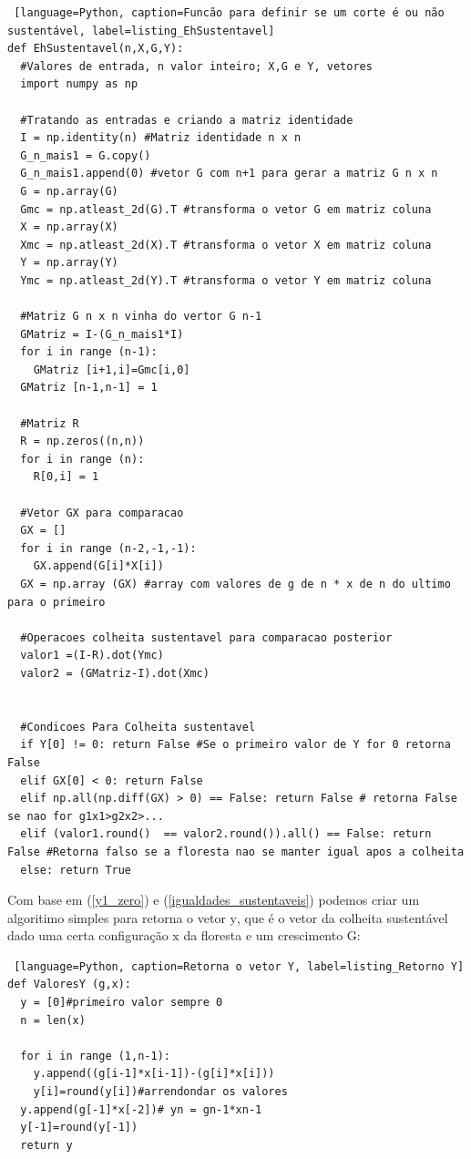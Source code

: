 \documentclass[a4paper, 12pt]{article}
\begin{document}
\begin{lstlisting} [language=Python, caption=Funcão para definir se um corte é ou não sustentável, label=listing_EhSustentavel]
def EhSustentavel(n,X,G,Y): 
  #Valores de entrada, n valor inteiro; X,G e Y, vetores
  import numpy as np
  
  #Tratando as entradas e criando a matriz identidade
  I = np.identity(n) #Matriz identidade n x n
  G_n_mais1 = G.copy()
  G_n_mais1.append(0) #vetor G com n+1 para gerar a matriz G n x n
  G = np.array(G)
  Gmc = np.atleast_2d(G).T #transforma o vetor G em matriz coluna
  X = np.array(X)
  Xmc = np.atleast_2d(X).T #transforma o vetor X em matriz coluna
  Y = np.array(Y)
  Ymc = np.atleast_2d(Y).T #transforma o vetor Y em matriz coluna

  #Matriz G n x n vinha do vertor G n-1
  GMatriz = I-(G_n_mais1*I)
  for i in range (n-1):
    GMatriz [i+1,i]=Gmc[i,0]
  GMatriz [n-1,n-1] = 1

  #Matriz R
  R = np.zeros((n,n))
  for i in range (n):
    R[0,i] = 1

  #Vetor GX para comparacao
  GX = [] 
  for i in range (n-2,-1,-1):
    GX.append(G[i]*X[i])
  GX = np.array (GX) #array com valores de g de n * x de n do ultimo para o primeiro
  
  #Operacoes colheita sustentavel para comparacao posterior
  valor1 =(I-R).dot(Ymc)
  valor2 = (GMatriz-I).dot(Xmc)


  #Condicoes Para Colheita sustentavel
  if Y[0] != 0: return False #Se o primeiro valor de Y for 0 retorna False
  elif GX[0] < 0: return False
  elif np.all(np.diff(GX) > 0) == False: return False # retorna False se nao for g1x1>g2x2>...
  elif (valor1.round()  == valor2.round()).all() == False: return False #Retorna falso se a floresta nao se manter igual apos a colheita
  else: return True
\end{lstlisting}

Com base em (\ref{y1_zero}) e (\ref{igualdades_sustentaveis}) podemos criar um algoritimo simples para retorna o vetor $\mathrm{y}$, que é o vetor da colheita sustentável dado uma certa configuração $\mathrm{x}$ da floresta e um crescimento $\mathrm{G}$:

\begin{lstlisting} [language=Python, caption=Retorna o vetor Y, label=listing_Retorno Y]
def ValoresY (g,x):
  y = [0]#primeiro valor sempre 0
  n = len(x)

  for i in range (1,n-1):
    y.append((g[i-1]*x[i-1])-(g[i]*x[i]))
    y[i]=round(y[i])#arrendondar os valores 
  y.append(g[-1]*x[-2])# yn = gn-1*xn-1
  y[-1]=round(y[-1])
  return y
\end{lstlisting}
\end{document}
